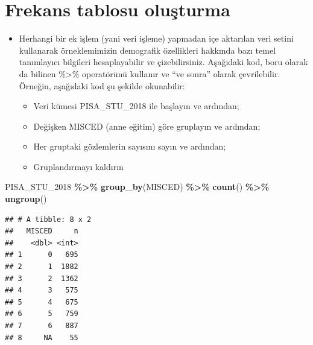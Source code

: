 \documentclass[
  oneside]{book}
\newenvironment{Shaded}{\begin{snugshade}}{\end{snugshade}}
\newcommand{\FunctionTok}[1]{\textcolor[rgb]{0.13,0.29,0.53}{\textbf{#1}}}
\newcommand{\NormalTok}[1]{#1}
\newcommand{\SpecialCharTok}[1]{\textcolor[rgb]{0.81,0.36,0.00}{\textbf{#1}}}
\begin{document}
\hypertarget{frekans-tablosu-oluux15fturma}{%
\section{Frekans tablosu oluşturma}\label{frekans-tablosu-oluux15fturma}}

\begin{itemize}
\item
  Herhangi bir ek işlem (yani veri işleme) yapmadan içe aktarılan veri setini kullanarak örneklemimizin demografik özellikleri hakkında bazı temel tanımlayıcı bilgileri hesaplayabilir ve çizebilirsiniz. Aşağıdaki kod, boru olarak da bilinen \%\textgreater\% operatörünü kullanır ve ``ve sonra'' olarak çevrilebilir. Örneğin, aşağıdaki kod şu şekilde okunabilir:

  \begin{itemize}
  \item
    Veri kümesi PISA\_STU\_2018 ile başlayın ve ardından;
  \item
    Değişken MISCED (anne eğitim) göre gruplayın ve ardından;
  \item
    Her gruptaki gözlemlerin sayısını sayın ve ardından;
  \item
    Gruplandırmayı kaldırın
  \end{itemize}
\end{itemize}

\begin{Shaded}
\begin{Highlighting}[]
\NormalTok{PISA\_STU\_2018 }\SpecialCharTok{\%\textgreater{}\%}
  \FunctionTok{group\_by}\NormalTok{(MISCED) }\SpecialCharTok{\%\textgreater{}\%}
  \FunctionTok{count}\NormalTok{() }\SpecialCharTok{\%\textgreater{}\%}
  \FunctionTok{ungroup}\NormalTok{()}
\end{Highlighting}
\end{Shaded}

\begin{verbatim}
## # A tibble: 8 x 2
##   MISCED     n
##    <dbl> <int>
## 1      0   695
## 2      1  1882
## 3      2  1362
## 4      3   575
## 5      4   675
## 6      5   759
## 7      6   887
## 8     NA    55
\end{verbatim}
\end{document}
